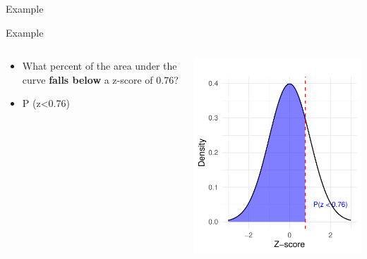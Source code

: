 \documentclass[
  ignorenonframetext,
]{beamer}
\providecommand{\tightlist}{%
  \setlength{\itemsep}{0pt}\setlength{\parskip}{0pt}}
\begin{document}
\begin{frame}{Example}
\label{example}
\end{frame}

\begin{frame}{Example}
\label{example-1}
\begin{columns}[T]
\begin{column}{0.5\textwidth}
\vspace{1cm}

\begin{itemize}
\tightlist
\item
  What percent of the area under the curve \textbf{falls below} a
  z-score of 0.76?
\end{itemize}

\begin{itemize}
\tightlist
\item
  P (z\textless0.76)
\end{itemize}
\end{column}

\begin{column}{0.5\textwidth}
\vspace{1cm}

\includegraphics{M5-Hypothesis-Testing,-Probability-and-Distribution_files/figure-beamer/unnamed-chunk-15-1.pdf}
\end{column}
\end{columns}
\end{frame}
\end{document}
